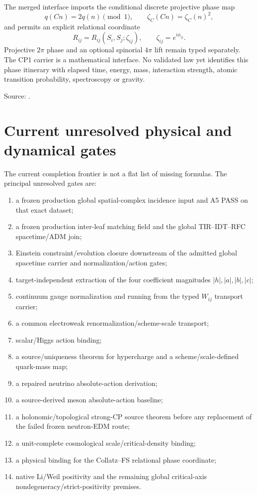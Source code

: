 The merged interface imports the conditional discrete projective phase map
\[
q(Cn)=2q(n)\pmod1,
\qquad
\boxed{\zeta_C(Cn)=\zeta_C(n)^2},
\]
and permits an explicit relational coordinate
\[
R_{ij}=R_{ij}(S_i,S_j;\zeta_{ij}),
\qquad \zeta_{ij}=e^{i\phi_{ij}}.
\]
Projective \(2\pi\) phase and an optional spinorial \(4\pi\) lift remain typed
separately.  The CP1 carrier is a mathematical interface.  No validated law yet
identifies this phase itinerary with elapsed time, energy, mass, interaction
strength, atomic transition probability, spectroscopy or gravity.

Source:
.

\section{Current unresolved physical and dynamical gates}

The current completion frontier is not a flat list of missing formulas.  The
principal unresolved gates are:

\begin{enumerate}
\item a frozen production global spatial-complex incidence input and A5 PASS on
that exact dataset;
\item a frozen production inter-leaf matching field and the global TIR--IDT--RFC
spacetime/ADM join;
\item Einstein constraint/evolution closure downstream of the admitted global
spacetime carrier and normalization/action gates;
\item target-independent extraction of the four coefficient magnitudes
\(|h|,|a|,|b|,|c|\);
\item continuum gauge normalization and running from the typed \(W_{ij}\)
transport carrier;
\item a common electroweak renormalization/scheme-scale transport;
\item scalar/Higgs action binding;
\item a source/uniqueness theorem for hypercharge and a scheme/scale-defined
quark-mass map;
\item a repaired neutrino absolute-action derivation;
\item a source-derived meson absolute-action baseline;
\item a holonomic/topological strong-CP source theorem before any replacement
of the failed frozen neutron-EDM route;
\item a unit-complete cosmological scale/critical-density binding;
\item a physical binding for the Collatz--FS relational phase coordinate;
\item native Li/Weil positivity and the remaining global critical-axis
nondegeneracy/strict-positivity premises.
\end{enumerate}

